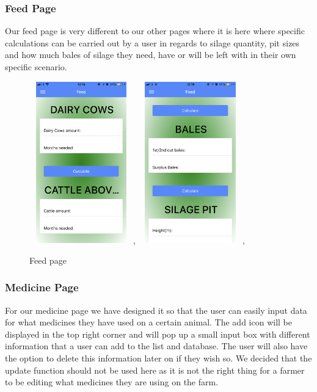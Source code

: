 \documentclass[12pt,a4paper,oneside,openany]{book}
\begin{document}
\subsubsection{Feed Page}
Our feed page is very different to our other pages where it is here where specific calculations can be carried out by a user in regards to silage quantity, pit sizes and how much bales of silage they need, have or will be left with in their own specific scenario. 

\begin{figure}[ht]
\renewcommand\thefigure{5.13}
\centering
\includegraphics[width=4.5cm,height=7cm]{Images/feed1.png},
\includegraphics[width=4.5cm,height=7cm]{Images/feed2.png},
\caption{Feed page}
\label{feed}
\end{figure}

\subsubsection{Medicine Page}
For our medicine page we have designed it so that the user can easily input data for what medicines they have used on a certain animal. The add icon will be displayed in the top right corner and will pop up a small input box with different information that a user can add to the list and database. The user will also have the option to delete this information later on if they wish so. We decided that the update function should not be used here as it is not the right thing for a farmer to be editing what medicines they are using on the farm.
\end{document}
